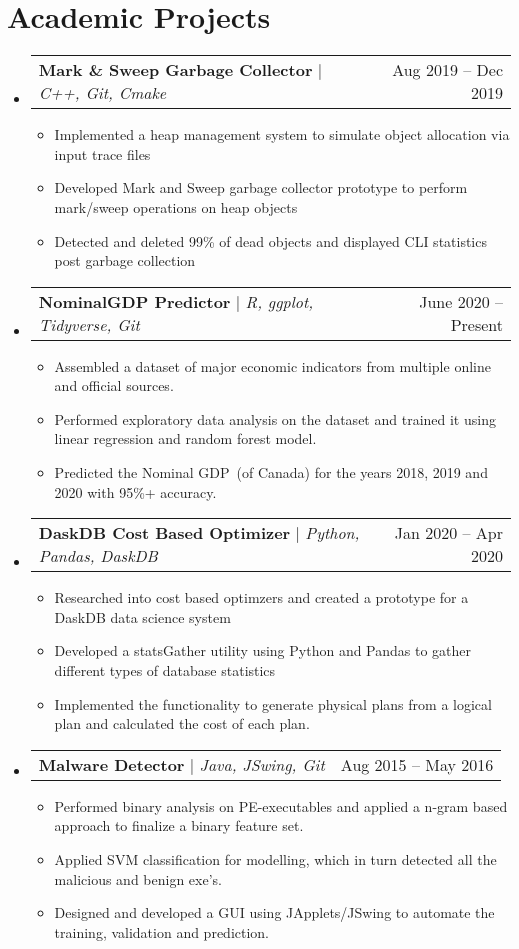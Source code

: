 \documentclass[letterpaper,10pt]{article}
\makeatletter
\newcommand{\resumeItem}[1]{
  \item\small{
    {#1 \vspace{-2pt}}
  }
}
\newcommand{\resumeProjectHeading}[2]{
    \item
    \begin{tabular*}{0.97\textwidth}{l@{\extracolsep{\fill}}r}
      \small#1 & #2 \\
    \end{tabular*}\vspace{-7pt}
}
\newcommand{\resumeSubHeadingListStart}{\begin{itemize}[leftmargin=0.15in, label={}]}
\newcommand{\resumeSubHeadingListEnd}{\end{itemize}}
\newcommand{\resumeItemListStart}{\begin{itemize}}
\newcommand{\resumeItemListEnd}{\end{itemize}\vspace{-5pt}}
\makeatother
\begin{document}
\section{Academic Projects}
    \resumeSubHeadingListStart
    \resumeProjectHeading
          {\textbf{Mark \& Sweep Garbage Collector} $|$ \emph{C++, Git, Cmake}}{Aug 2019 -- Dec 2019}
          \resumeItemListStart
            \resumeItem{Implemented a heap management system to simulate object allocation via input trace files}
            \resumeItem{Developed Mark and Sweep garbage collector prototype to perform mark/sweep operations on heap objects}
            \resumeItem{Detected and deleted 99\% of dead objects and displayed CLI statistics post garbage collection}
          \resumeItemListEnd  
      \resumeProjectHeading
          {\textbf{NominalGDP Predictor} $|$ \emph{R, ggplot, Tidyverse, Git}}{June 2020 -- Present}
          \resumeItemListStart
            \resumeItem{Assembled a dataset of major economic indicators from multiple online and official sources.}
            \resumeItem{Performed exploratory data analysis on the dataset and trained it using linear regression and random forest model.}
            \resumeItem{Predicted the Nominal GDP~(of Canada) for the years 2018, 2019 and 2020 with 95\%+ accuracy.}
          \resumeItemListEnd
         \resumeProjectHeading
          {\textbf{DaskDB Cost Based Optimizer} $|$ \emph{Python, Pandas, DaskDB}}{Jan 2020 -- Apr 2020}
          \resumeItemListStart
            \resumeItem{Researched into cost based optimzers and created a prototype for a DaskDB data science system}
            \resumeItem{Developed a statsGather utility using Python and Pandas to gather different types of database statistics}
            \resumeItem{Implemented the functionality to generate physical plans from a logical plan and calculated the cost of each plan.}
          \resumeItemListEnd
      \resumeProjectHeading
          {\textbf{Malware Detector} $|$ \emph{Java, JSwing, Git}}{Aug 2015 -- May 2016}
          \resumeItemListStart
            \resumeItem{Performed binary analysis on PE-executables and applied a n-gram based approach to finalize a binary feature set.}
            \resumeItem{Applied SVM classification for modelling, which in turn detected all the malicious and benign exe's.}
            \resumeItem{Designed and developed a GUI using JApplets/JSwing to automate the training, validation and prediction.}
          \resumeItemListEnd
    \resumeSubHeadingListEnd
\end{document}
